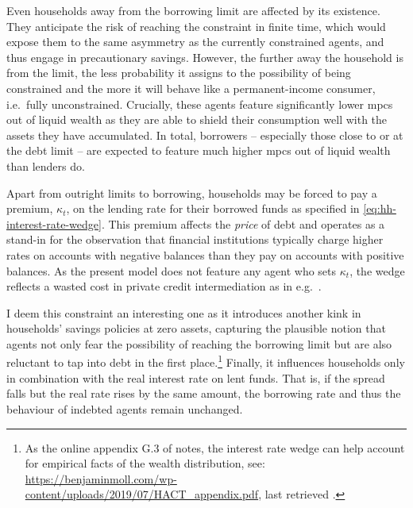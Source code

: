 \documentclass[a4paper,12pt]{article} %
\numberwithin{equation}{section} %
\numberwithin{figure}{section}
\numberwithin{table}{section}
\begin{document}
Even households away from the borrowing limit are affected by its existence. They anticipate the risk of reaching the constraint in finite time, which would expose them to the same asymmetry as the currently constrained agents, and thus engage in precautionary savings. However, the further away the household is from the limit, the less probability it assigns to the possibility of being constrained and the more it will behave like a permanent-income consumer, i.e.~fully unconstrained. Crucially, these agents feature significantly lower \Gls{mpc}s out of liquid wealth as they are able to shield their consumption well with the assets they have accumulated. In total, borrowers -- especially those close to or at the debt limit -- are expected to feature much higher \Gls{mpc}s out of liquid wealth than lenders do.

Apart from outright limits to borrowing, households may be forced to pay a premium, $\kappa_t$, on the lending rate for their borrowed funds as specified in \eqref{eq:hh-interest-rate-wedge}. This premium affects the \textit{price} of debt and operates as a stand-in for the observation that financial institutions typically charge higher rates on accounts with negative balances than they pay on accounts with positive balances. As the present model does not feature any agent who sets $\kappa_t$, the wedge reflects a wasted cost in private credit intermediation as in e.g.~\textcite{bayer2023}.

I deem this constraint an interesting one as it introduces another kink in households' savings policies at zero assets, capturing the plausible notion that agents not only fear the possibility of reaching the borrowing limit but are also reluctant to tap into debt in the first place.\footnote{As the online appendix G.3 of \textcite{achdou2022} notes, the interest rate wedge can help account for empirical facts of the wealth distribution, see: \url{https://benjaminmoll.com/wp-content/uploads/2019/07/HACT_appendix.pdf}, last retrieved .} Finally, it influences households only in combination with the real interest rate on lent funds. That is, if the spread falls but the real rate rises by the same amount, the borrowing rate and thus the behaviour of indebted agents remain unchanged.
\end{document}
